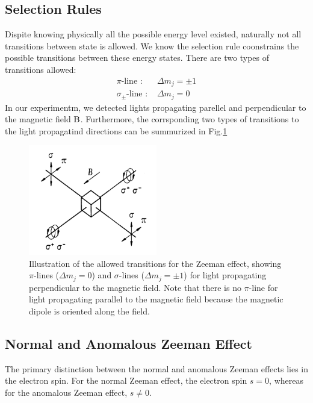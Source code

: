 \documentclass[a4paper,12pt]{article}
\begin{document}
\subsection{Selection Rules}
Dispite knowing physically all the possible energy level existed, naturally not all transitions between state is allowed. We know the selection rule coonstrains the possible transitions between these energy states. There are two types of transitions allowed: 
\begin{align}
    \text{$\pi$-line : }&\Delta m_j = \pm 1\\ 
    \text{$\sigma_{\pm}$-line : }&\Delta m_j = 0 
\end{align}
\indent In our experimentm, we detected lights propagating parellel and perpendicular to the magnetic field $\bold{\mathrm{B}}$. Furthermore, the corrsponding two types of transitions to the light propagatind directions can be summurized in Fig.\ref{fig:zeeman_effect_1}
\begin{figure}[H] %
    \centering
    \includegraphics[width=0.5\textwidth]{Zeeman_effect_1.png}
    \caption{Illustration of the allowed transitions for the Zeeman effect, showing $\pi$-lines ($\Delta m_j = 0$) and $\sigma$-lines ($\Delta m_j = \pm 1$) for light propagating perpendicular to the magnetic field. Note that there is no $\pi$-line for light propagating parallel to the magnetic field because the magnetic dipole is oriented along the field. \cite{phyweZeeman}}
    \label{fig:zeeman_effect_1}
\end{figure}

\subsection{Normal and Anomalous Zeeman Effect}
The primary distinction between the normal and anomalous Zeeman effects lies in the electron spin. For the normal Zeeman effect, the electron spin $s = 0$, whereas for the anomalous Zeeman effect, $s \neq 0$. 
\end{document}
